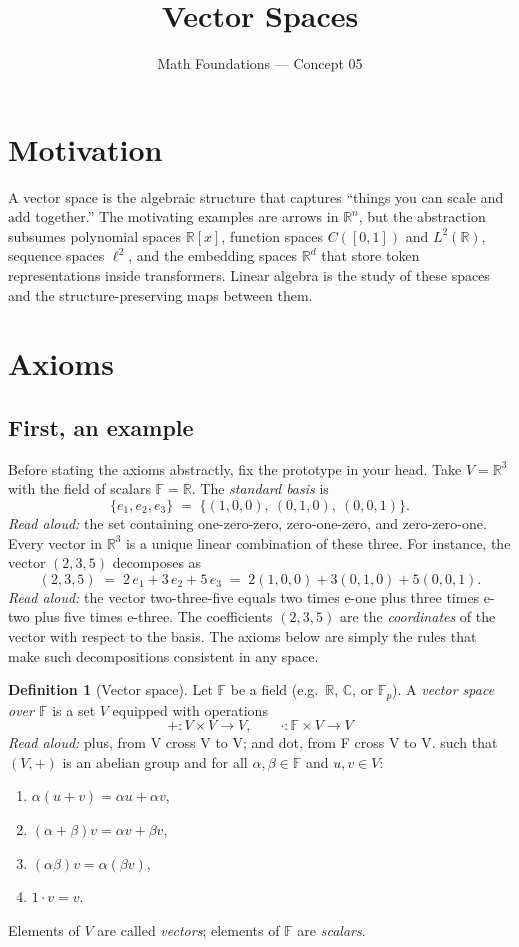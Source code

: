 \documentclass[11pt]{article}
\title{Vector Spaces}
\author{Math Foundations --- Concept 05}
\date{}
\theoremstyle{definition}
\newtheorem{definition}[theorem]{Definition}
\begin{document}
\maketitle

\section{Motivation}

A vector space is the algebraic structure that captures ``things you can scale and add together.'' The motivating examples are arrows in $\mathbb{R}^n$, but the abstraction subsumes polynomial spaces $\mathbb{R}[x]$, function spaces $C([0,1])$ and $L^2(\mathbb{R})$, sequence spaces $\ell^2$, and the embedding spaces $\mathbb{R}^d$ that store token representations inside transformers. Linear algebra is the study of these spaces and the structure-preserving maps between them.

\section{Axioms}

\subsection*{First, an example}
Before stating the axioms abstractly, fix the prototype in your head. Take $V = \mathbb{R}^3$ with the field of scalars $\mathbb{F} = \mathbb{R}$. The \emph{standard basis} is
\[
\{e_1, e_2, e_3\} \;=\; \{(1,0,0),\ (0,1,0),\ (0,0,1)\}.
\]
\emph{Read aloud:} the set containing one-zero-zero, zero-one-zero, and zero-zero-one.
Every vector in $\mathbb{R}^3$ is a unique linear combination of these three. For instance, the vector $(2, 3, 5)$ decomposes as
\[
(2, 3, 5) \;=\; 2\,e_1 + 3\,e_2 + 5\,e_3 \;=\; 2(1,0,0) + 3(0,1,0) + 5(0,0,1).
\]
\emph{Read aloud:} the vector two-three-five equals two times e-one plus three times e-two plus five times e-three.
The coefficients $(2,3,5)$ are the \emph{coordinates} of the vector with respect to the basis. The axioms below are simply the rules that make such decompositions consistent in any space.

\begin{definition}[Vector space]
Let $\mathbb{F}$ be a field (e.g.\ $\mathbb{R}$, $\mathbb{C}$, or $\mathbb{F}_p$). A \emph{vector space over $\mathbb{F}$} is a set $V$ equipped with operations
\[
+ : V \times V \to V, \qquad \cdot : \mathbb{F} \times V \to V
\]
\emph{Read aloud:} plus, from V cross V to V; and dot, from F cross V to V.
such that $(V, +)$ is an abelian group and for all $\alpha, \beta \in \mathbb{F}$ and $u, v \in V$:
\begin{enumerate}
  \item $\alpha(u + v) = \alpha u + \alpha v$,
  \item $(\alpha + \beta) v = \alpha v + \beta v$,
  \item $(\alpha\beta) v = \alpha(\beta v)$,
  \item $1 \cdot v = v$.
\end{enumerate}
Elements of $V$ are called \emph{vectors}; elements of $\mathbb{F}$ are \emph{scalars}.
\end{definition}
\end{document}
